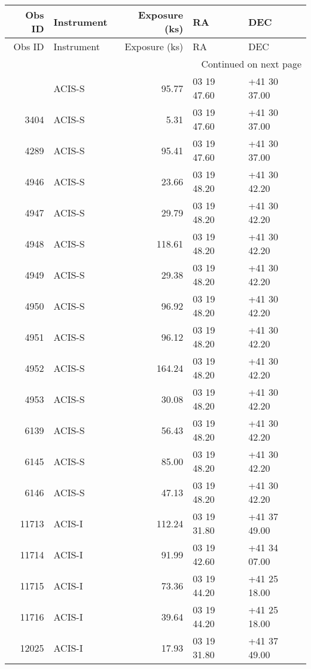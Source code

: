 \begin{longtable}{rlrll}
\toprule
 Obs ID & Instrument &  Exposure (ks) &          RA &          DEC \\
\midrule
\endfirsthead

\toprule
 Obs ID & Instrument &  Exposure (ks) &          RA &          DEC \\
\midrule
\endhead
\midrule
\multicolumn{5}{r}{{Continued on next page}} \\
\midrule
\endfoot

\bottomrule
\endlastfoot
   3209 &     ACIS-S &          95.77 & 03 19 47.60 & +41 30 37.00 \\
   3404 &     ACIS-S &           5.31 & 03 19 47.60 & +41 30 37.00 \\
   4289 &     ACIS-S &          95.41 & 03 19 47.60 & +41 30 37.00 \\
   4946 &     ACIS-S &          23.66 & 03 19 48.20 & +41 30 42.20 \\
   4947 &     ACIS-S &          29.79 & 03 19 48.20 & +41 30 42.20 \\
   4948 &     ACIS-S &         118.61 & 03 19 48.20 & +41 30 42.20 \\
   4949 &     ACIS-S &          29.38 & 03 19 48.20 & +41 30 42.20 \\
   4950 &     ACIS-S &          96.92 & 03 19 48.20 & +41 30 42.20 \\
   4951 &     ACIS-S &          96.12 & 03 19 48.20 & +41 30 42.20 \\
   4952 &     ACIS-S &         164.24 & 03 19 48.20 & +41 30 42.20 \\
   4953 &     ACIS-S &          30.08 & 03 19 48.20 & +41 30 42.20 \\
   6139 &     ACIS-S &          56.43 & 03 19 48.20 & +41 30 42.20 \\
   6145 &     ACIS-S &          85.00 & 03 19 48.20 & +41 30 42.20 \\
   6146 &     ACIS-S &          47.13 & 03 19 48.20 & +41 30 42.20 \\
  11713 &     ACIS-I &         112.24 & 03 19 31.80 & +41 37 49.00 \\
  11714 &     ACIS-I &          91.99 & 03 19 42.60 & +41 34 07.00 \\
  11715 &     ACIS-I &          73.36 & 03 19 44.20 & +41 25 18.00 \\
  11716 &     ACIS-I &          39.64 & 03 19 44.20 & +41 25 18.00 \\
  12025 &     ACIS-I &          17.93 & 03 19 31.80 & +41 37 49.00 \\

\end{longtable}
